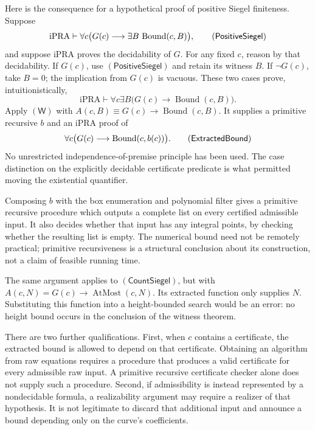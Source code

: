 Here is the consequence for a hypothetical proof of positive Siegel
finiteness.  Suppose
\[
 \mathrm{iPRA}\vdash
 \forall c\bigl(G(c)\longrightarrow
          \exists B\,\operatorname{Bound}(c,B)\bigr),
 \tag{\textsf{PositiveSiegel}}
\]
and suppose iPRA proves the decidability of $G$.  For any fixed $c$, reason
by that decidability.  If $G(c)$, use $(\mathsf{PositiveSiegel})$ and retain
its witness $B$.  If $\neg G(c)$, take $B=0$; the implication from $G(c)$
is vacuous.  These two cases prove, intuitionistically,
\[
 \mathrm{iPRA}\vdash\forall c\exists B
       \bigl(G(c)\longrightarrow\operatorname{Bound}(c,B)\bigr).
\]
Apply $(\mathsf W)$ with
$A(c,B)\equiv G(c)\to\operatorname{Bound}(c,B)$.  It supplies a primitive
recursive $b$ and an iPRA proof of
\[
 \forall c\bigl(G(c)\longrightarrow
                         \operatorname{Bound}(c,b(c))\bigr).
 \tag{\textsf{ExtractedBound}}
\]
No unrestricted independence-of-premise principle has been used.  The
case distinction on the explicitly decidable certificate predicate is
what permitted moving the existential quantifier.

Composing $b$ with the box enumeration and polynomial filter gives a
primitive recursive procedure which outputs a complete list on every
certified admissible input.  It also decides whether that input has any
integral points, by checking whether the resulting list is empty.  The
numerical bound need not be remotely practical; primitive recursiveness
is a structural conclusion about its construction, not a claim of
feasible running time.

The same argument applies to $(\mathsf{CountSiegel})$, but with
$A(c,N)=G(c)\to\operatorname{AtMost}(c,N)$.  Its extracted function only
supplies $N$.  Substituting this function into a height-bounded search
would be an error: no height bound occurs in the conclusion of the
witness theorem.

There are two further qualifications.  First, when $c$ contains a
certificate, the extracted bound is allowed to depend on that certificate.
Obtaining an algorithm from raw equations requires a procedure that
produces a valid certificate for every admissible raw input.  A
primitive recursive certificate checker alone does not supply such a
procedure.  Second, if admissibility is instead represented by a
nondecidable formula, a realizability argument may require a realizer of
that hypothesis.  It is not legitimate to discard that additional input
and announce a bound depending only on the curve's coefficients.

